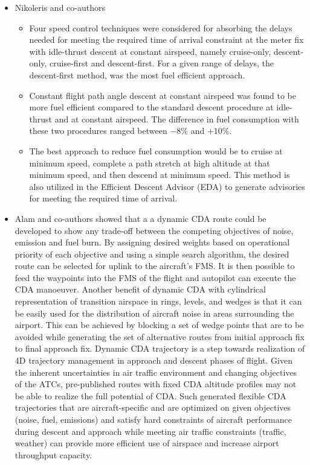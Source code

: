 \documentclass{aer1315-pretty}
\begin{document}
\begin{itemize}
\item Nikoleris and co-authors \cite{Niko:2012} 
\begin{itemize}
\item Four speed control techniques were considered for absorbing the delays needed for meeting the required time of arrival constraint at the meter fix with idle-thrust descent at constant airspeed, namely cruise-only, descent-only, cruise-first and descent-first. For a given range of delays, the descent-first method, was the most fuel efficient approach.
\item  Constant flight path angle descent at constant airspeed was found to be more fuel efficient compared to the standard descent procedure at idle-thrust and at constant airspeed. The difference in fuel consumption with these two procedures ranged between $-8\%$ and $+10\%$.
\item  The best approach to reduce fuel consumption would be to cruise at minimum speed, complete a path stretch at high altitude at that minimum speed, and then descend at minimum speed. This method is also utilized in the Efficient Descent Advisor (EDA) to generate advisories for meeting the required time of arrival.
\end{itemize}



\item Alam and co-authors \cite{Alam:2010} showed that a a dynamic CDA route could be developed to show any trade-off between the competing objectives of noise, emission and fuel burn. By assigning desired weights based on operational priority of each objective and using a simple search algorithm, the desired route can be selected for uplink to the aircraft's FMS. It is then possible to feed the waypoints into the FMS of the flight and autopilot can execute the CDA manoeuver.
Another benefit of dynamic CDA with cylindrical representation of transition airspace in rings, levels, and wedges is that it can be easily used for the distribution of aircraft noise in areas surrounding the airport. This can be achieved by blocking a set of wedge points that are to be avoided while generating the set of alternative routes from initial approach fix to final approach fix. 
Dynamic CDA trajectory is a step towards realization of 4D trajectory management in approach and descent phases of flight. Given the inherent uncertainties in air traffic environment and changing objectives of the ATCs, pre-published routes with fixed CDA altitude profiles may not be able to realize the full potential of CDA.
Such generated flexible CDA trajectories that are aircraft-specific and are optimized on given objectives (noise, fuel, emissions) and satisfy hard constraints of aircraft performance during descent and approach while meeting air traffic constraints (traffic, weather) can provide more efficient use of airspace and increase airport throughput capacity.



\end{itemize}
\end{document}
